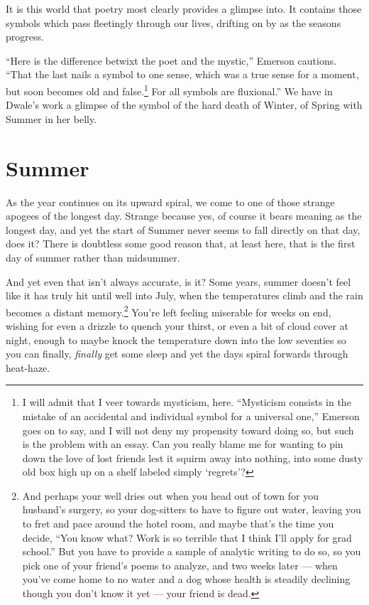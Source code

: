 \documentclass[12pt,oneside]{memoir}
\begin{document}
It is this world that poetry most clearly provides a glimpse into. It contains those symbols which pass fleetingly through our lives, drifting on by as the seasons progress.

``Here is the difference betwixt the poet and the mystic,'' Emerson cautions. ``That the last nails a symbol to one sense, which was a true sense for a moment, but soon becomes old and false.\footnote{I will admit that I veer towards mysticism, here. ``Mysticism consists in the mistake of an accidental and individual symbol for a universal one,'' Emerson goes on to say, and I will not deny my propensity toward doing so, but such is the problem with an essay. Can you really blame me for wanting to pin down the love of lost friends lest it squirm away into nothing, into some dusty old box high up on a shelf labeled simply `regrets'?} For all symbols are fluxional.'' \parencite[33]{emerson} We have in Dwale's work a glimpse of the symbol of the hard death of Winter, of Spring with Summer in her belly.


\section*{Summer}

As the year continues on its upward spiral, we come to one of those strange apogees of the longest day. Strange because yes, of course it bears meaning as the longest day, and yet the start of Summer never seems to fall directly on that day, does it? There is doubtless some good reason that, at least here, that is the first day of summer rather than midsummer.

And yet even that isn't always accurate, is it? Some years, summer doesn't feel like it has truly hit until well into July, when the temperatures climb and the rain becomes a distant memory.\footnote{And perhaps your well dries out when you head out of town for you husband's surgery, so your dog-sitters to have to figure out water, leaving you to fret and pace around the hotel room, and maybe that's the time you decide, ``You know what? Work is so terrible that I think I'll apply for grad school.'' But you have to provide a sample of analytic writing to do so, so you pick one of your friend's poems to analyze, and two weeks later --- when you've come home to no water and a dog whose health is steadily declining though you don't know it yet --- your friend is dead.} You're left feeling miserable for weeks on end, wishing for even a drizzle to quench your thirst, or even a bit of cloud cover at night, enough to maybe knock the temperature down into the low seventies so you can finally, \emph{finally} get some sleep and yet the days spiral forwards through heat-haze.
\end{document}
